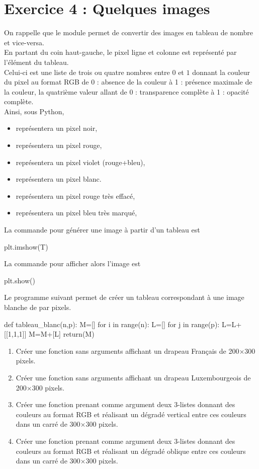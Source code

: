 \documentclass[11pt,a4paper,french,twoside]{PMCours}
\begin{document}
\section*{Exercice 4 : Quelques images}
On rappelle que le module  permet de convertir des images en tableau de nombre et vice-versa.\\
En partant du coin haut-gauche, le pixel ligne  et colonne  est représenté par l'élément \code{[i][j]} du tableau.\\
Celui-ci est une liste de trois ou quatre nombres entre $0$ et $1$ donnant la couleur du pixel au format RGB de 0 : absence de la couleur à 1 : présence maximale de la couleur, la quatrième valeur allant de 0 : transparence complète à 1 : opacité complète.\\
Ainsi, sous Python, 
\begin{itemize}
\item \code{[0,0,0]} repr\'esentera un pixel noir,
\item \code{[1,0,0]} repr\'esentera un pixel rouge,
\item \code{[1,0,1]}repr\'esentera un pixel violet (rouge+bleu),
\item \code{[1,1,1]} repr\'esentera un pixel blanc.
\item \code{[1,0,0,0.2]} repr\'esentera un pixel rouge très effacé,
\item \code{[0,0,1,1]} repr\'esentera un pixel bleu très marqué,
\end{itemize} 
La commande pour générer une image à partir d'un tableau  est 
\begin{Python}
plt.imshow(T)
\end{Python}
La commande pour afficher alors l'image est 
\begin{Python}
plt.show()
\end{Python}
Le programme suivant permet de créer un tableau correspondant à une image blanche de  par  pixels.
\begin{Python}
def tableau_blanc(n,p):
    M=[]
    for i in range(n):
        L=[]
        for j in range(p):
            L=L+[[1,1,1]]
        M=M+[L]
    return(M)
\end{Python}
\begin{enumerate}
\item Créer une fonction  sans arguments affichant un drapeau Français de 200$\times$300 pixels.
\item Créer une fonction  sans arguments affichant un drapeau Luxembourgeois de 200$\times$300 pixels.
\item Créer une fonction  prenant comme argument deux 3-listes donnant des couleurs au format RGB et réalisant un dégradé vertical entre ces couleurs dans un carré de 300$\times$300 pixels.
\item Créer une fonction  prenant comme argument deux 3-listes donnant des couleurs au format RGB et réalisant un dégradé oblique entre ces couleurs dans un carré de 300$\times$300 pixels.
\end{enumerate} 
 
\end{document}
